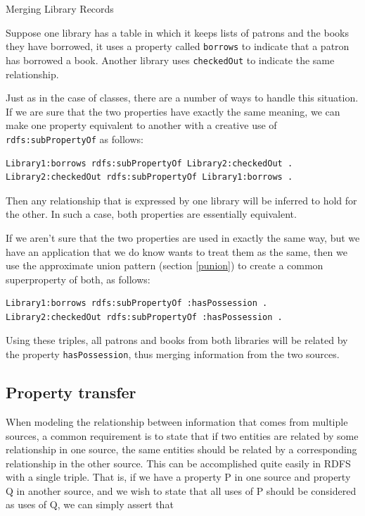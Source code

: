 \begin{example}{Merging Library Records}
\label{ex:ch8.1}

Suppose one library has a table in which it keeps lists of patrons and
the books they have borrowed, it uses a property called \texttt{borrows} to
indicate that a patron has borrowed a book. Another library uses
\texttt{checkedOut} to indicate the same relationship.

Just as in the case of classes, there are a number of ways to handle
this situation. If we are sure that the two
properties have exactly the same meaning, we can make one property
equivalent to another with a creative use of \texttt{rdfs:subPropertyOf} as
follows:

\begin{lstlisting}
Library1:borrows rdfs:subPropertyOf Library2:checkedOut .
Library2:checkedOut rdfs:subPropertyOf Library1:borrows .
\end{lstlisting}

Then any relationship that is expressed by one library will be inferred
to hold for the other. In such a case, both properties are essentially
equivalent.

If we aren't sure that the two properties are used in exactly the same
way, but we have an application that
we do know wants to treat them as the same, then we use the approximate union
pattern (section \ref{punion}) to create a common superproperty of both, as follows:

\begin{lstlisting}
Library1:borrows rdfs:subPropertyOf :hasPossession .
Library2:checkedOut rdfs:subPropertyOf :hasPossession .
\end{lstlisting}

Using these triples, all patrons and books from both libraries will be
related by the property \texttt{hasPossession}, thus merging information from the
two sources.
\end{example}

\subsection{Property transfer}

When modeling the relationship between information that comes from
multiple sources, a common requirement is to state that if two entities
are related by some relationship in one source, the same entities should
be related by a corresponding relationship in the other source. This can
be accomplished quite easily in RDFS with a single triple. That is, if
we have a property P in one source and property Q in another source, and
we wish to state that all uses of P should be considered as uses of Q,
we can simply assert that

